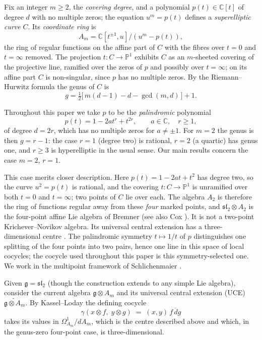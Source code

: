 \documentclass[12pt]{amsart}
\theoremstyle{plain}
\theoremstyle{definition}
\newcommand{\CC}{\mathbb{C}}
\newcommand{\fg}{\mathfrak{g}}
\begin{document}
Fix an integer $m \geq 2$, the \emph{covering degree}, and a polynomial
$p(t) \in \CC[t]$ of degree $d$ with no multiple zeros; the equation
$u^m = p(t)$ defines a \emph{superelliptic curve} $C$. Its
\emph{coordinate ring} is
\[
  A_m = \CC[t^{\pm 1}, u] \big/ (u^m - p(t)),
\]
the ring of regular functions on the affine part of $C$ with the fibres
over $t = 0$ and $t = \infty$ removed. The projection $t \colon C \to \mathbb{P}^1$
exhibits $C$ as an $m$-sheeted covering of the projective line, ramified
over the zeros of $p$ and possibly over $t = \infty$; on its affine part
$C$ is non-singular, since $p$ has no multiple zeros. By the
Riemann--Hurwitz formula the genus of $C$ is
\[
  g = \tfrac{1}{2}\bigl[\, m(d-1) - d - \gcd(m,d) \,\bigr] + 1 .
\]

Throughout this paper we take $p$ to be the \emph{palindromic} polynomial
\[
  p(t) = 1 - 2a t^r + t^{2r}, \qquad a \in \CC, \quad r \geq 1,
\]
of degree $d = 2r$, which has no multiple zeros for $a \neq \pm 1$. For
$m = 2$ the genus is then $g = r - 1$: the case $r = 1$ (degree two) is
rational, $r = 2$ (a quartic) has genus one, and $r \geq 3$ is
hyperelliptic in the usual sense. Our main results concern the case
$m = 2$, $r = 1$.

This case merits closer description. Here $p(t) = 1 - 2at + t^2$ has degree two, so the
curve $u^2 = p(t)$ is rational, and the covering $t\colon C \to
\mathbb{P}^1$ is unramified over both $t=0$ and $t=\infty$; two points of
$C$ lie over each. The algebra $A_2$ is therefore the ring of functions
regular away from these \emph{four} marked points, and $\mathfrak{sl}_2
\otimes A_2$ is the four-point affine Lie algebra of Bremner
\cite[Prop.~1.1]{Bremner1995} (see also Cox \cite{Cox2008FourPoint}). It
is not a two-point Krichever--Novikov algebra. Its universal
central extension has a three-dimensional centre
\cite{Bremner1995,Schlichenmaier2017NPoint}. The palindromic symmetry
$t \mapsto 1/t$ of $p$ distinguishes one splitting of the four points
into two pairs, hence one line in this space of local cocycles; the
cocycle used throughout this paper is this symmetry-selected one. We
work in the multipoint framework of Schlichenmaier
\cite{Schlichenmaier1990a,Schlichenmaier1990b}.

Given $\fg = \mathfrak{sl}_2$ (though the construction extends to
any simple Lie algebra), consider the current algebra $\fg \otimes A_m$
and its universal central extension (UCE) $\widetilde{\fg \otimes A_m}$.
By Kassel--Loday \cite{KasselLoday1982} the defining cocycle
\[
  \gamma(x \otimes f,\; y \otimes g) \;=\; (x,y)\,\overline{f\,dg}
\]
takes its values in $\Omega^1_{A_m}/dA_m$, which is the centre described
above and which, in the genus-zero four-point case, is three-dimensional.
\end{document}
